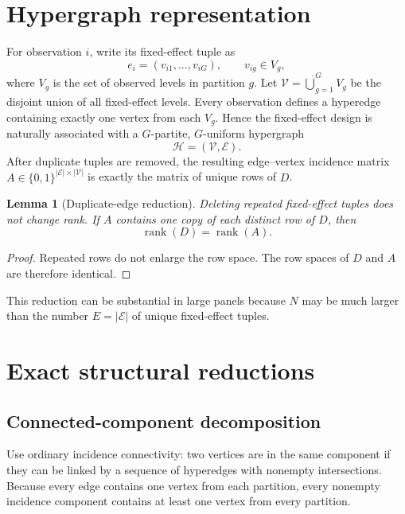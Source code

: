 \documentclass[11pt]{article}
\newtheorem{lemma}[theorem]{Lemma}
\theoremstyle{definition}
\newcommand{\rank}{\operatorname{rank}}
\newcommand{\1}{\mathbf{1}}
\newcommand{\EE}{\mathcal{E}}
\newcommand{\VV}{\mathcal{V}}
\newcommand{\HH}{\mathcal{H}}
\begin{document}
\section{Hypergraph representation}

For observation $i$, write its fixed-effect tuple as
\begin{equation}
  e_i=(v_{i1},\ldots,v_{iG}), \qquad v_{ig}\in V_g,
\end{equation}
where $V_g$ is the set of observed levels in partition $g$. Let $\VV=\dot\bigcup_{g=1}^{G}V_g$ be the disjoint union of all fixed-effect levels. Every observation defines a hyperedge containing exactly one vertex from each $V_g$. Hence the fixed-effect design is naturally associated with a $G$-partite, $G$-uniform hypergraph
\begin{equation}
  \HH=(\VV,\EE).
\end{equation}
After duplicate tuples are removed, the resulting edge--vertex incidence matrix $A\in\{0,1\}^{|\EE|\times |\VV|}$ is exactly the matrix of unique rows of $D$.

\begin{lemma}[Duplicate-edge reduction]\label{lem:dedup}
Deleting repeated fixed-effect tuples does not change rank. If $A$ contains one copy of each distinct row of $D$, then
\begin{equation}
  \rank(D)=\rank(A).
\end{equation}
\end{lemma}

\begin{proof}
Repeated rows do not enlarge the row space. The row spaces of $D$ and $A$ are therefore identical.
\end{proof}

This reduction can be substantial in large panels because $N$ may be much larger than the number $E=|\EE|$ of unique fixed-effect tuples.

\section{Exact structural reductions}

\subsection{Connected-component decomposition}

Use ordinary incidence connectivity: two vertices are in the same component if they can be linked by a sequence of hyperedges with nonempty intersections. Because every edge contains one vertex from each partition, every nonempty incidence component contains at least one vertex from every partition.
\end{document}

